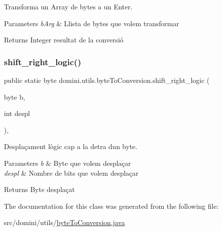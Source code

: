 Transforma un Array de bytes a un Enter. 


\begin{DoxyParams}{Parameters}
{\em b\+Arg} & Llista de bytes que volem transformar \\
\hline
\end{DoxyParams}
\begin{DoxyReturn}{Returns}
Integer resultat de la conversió 
\end{DoxyReturn}
\mbox{\label{classdomini_1_1utils_1_1byteToConversion_a0e232cb9d272ccc13accda58bab9f8e1}} 
\subsubsection{\texorpdfstring{shift\+\_\+right\+\_\+logic()}{shift\_right\_logic()}}
{\footnotesize\ttfamily public static byte domini.\+utils.\+byte\+To\+Conversion.\+shift\+\_\+right\+\_\+logic (\begin{DoxyParamCaption}\item[{byte}]{b,  }\item[{int}]{despl }\end{DoxyParamCaption})\hspace{0.3cm}{\ttfamily [inline]}, {\ttfamily [static]}}



Desplaçament lògic cap a la detra d\textquotesingle{}un byte. 


\begin{DoxyParams}{Parameters}
{\em b} & Byte que volem desplaçar \\
\hline
{\em despl} & Nombre de bits que volem desplaçar \\
\hline
\end{DoxyParams}
\begin{DoxyReturn}{Returns}
Byte desplaçat 
\end{DoxyReturn}


The documentation for this class was generated from the following file\+:\begin{DoxyCompactItemize}
\item 
src/domini/utils/\hyperlink{byteToConversion_8java}{byte\+To\+Conversion.\+java}\end{DoxyCompactItemize}
